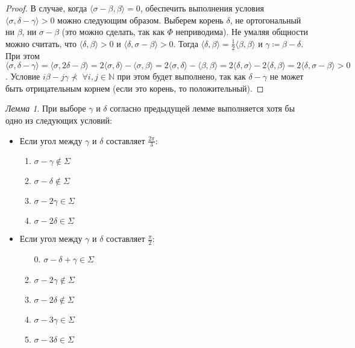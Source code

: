 \documentclass[10pt]{article}
\theoremstyle{remark}
\newtheorem{lm}{Лемма}
\newcommand{\N}{\mathbb{N}}
\begin{document}
\begin{proof}
В случае, когда $\langle\sigma-\beta,\beta\rangle=0$, обеспечить выполнения условия $\langle\sigma,\delta-\gamma\rangle>0$ можно следующим образом. Выберем корень $\delta$, не ортогональный ни $\beta$, ни $\sigma-\beta$ (это можно сделать, так как $\Phi$ неприводима). Не умаляя общности можно считать, что $\langle\delta,\beta\rangle>0$ и $\langle\delta,\sigma-\beta\rangle>0$. Тогда $\langle\delta,\beta\rangle=\frac{1}{2}\langle\beta,\beta\rangle$ и $\gamma\coloneqq\beta-\delta$. При этом
$\langle\sigma,\delta-\gamma\rangle =
\langle\sigma,2\delta-\beta\rangle =
2\langle\sigma,\delta\rangle-\langle\sigma,\beta\rangle = 
2\langle\sigma,\delta\rangle-\langle\beta,\beta\rangle =
2\langle\delta,\sigma\rangle-2\langle\delta,\beta\rangle =
2\langle\delta,\sigma-\beta\rangle > 0$.
Условие $i\beta-j\gamma\nprec\;\forall i,j\in\N$ при этом будет выполнено, так как  $\delta-\gamma$ не может быть отрицательным корнем (если это корень, то положительный).
\end{proof}

\begin{lm}\label{highestweightvariants}
При выборе $\gamma$ и $\delta$ согласно предыдущей лемме выполняется хотя бы одно из следующих условий:
\begin{itemize}
\item Если угол между $\gamma$ и $\delta$ составляет $\frac{2\pi}{3}$:
\begin{enumerate}
\item $ \sigma - \gamma \notin \Sigma$
\item $ \sigma - \delta \notin \Sigma$
\item $ \sigma - 2\gamma \in \Sigma$
\item $ \sigma - 2\delta \in \Sigma$
\end{enumerate}
\item Если угол между $\gamma$ и $\delta$ составляет $\frac{\pi}{2}$:
\begin{enumerate}
\item[0.] $ \sigma - \delta + \gamma \in \Sigma$
\item $ \sigma - 2\gamma \notin \Sigma$
\item $ \sigma - 2\delta \notin \Sigma$
\item $ \sigma - 3\gamma \in \Sigma$
\item $ \sigma - 3\delta \in \Sigma$
\end{enumerate}
\end{itemize}
\end{lm}
\end{document}

